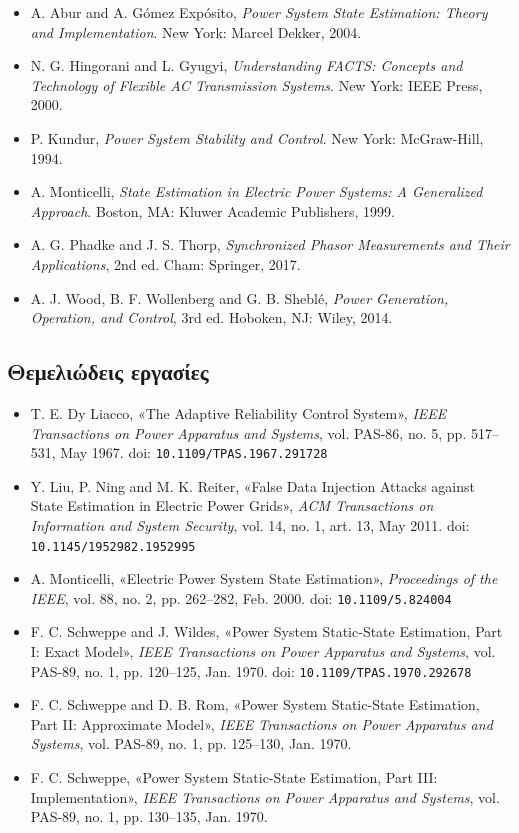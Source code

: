 \begin{itemize}
\item A. Abur and A. Gómez Expósito, \textit{Power System State Estimation: Theory and
      Implementation}. New York: Marcel Dekker, 2004.
\item N. G. Hingorani and L. Gyugyi, \textit{Understanding FACTS: Concepts and Technology of
      Flexible AC Transmission Systems}. New York: IEEE Press, 2000.
\item P. Kundur, \textit{Power System Stability and Control}. New York: McGraw-Hill, 1994.
\item A. Monticelli, \textit{State Estimation in Electric Power Systems: A Generalized
      Approach}. Boston, MA: Kluwer Academic Publishers, 1999.
\item A. G. Phadke and J. S. Thorp, \textit{Synchronized Phasor Measurements and Their
      Applications}, 2nd ed. Cham: Springer, 2017.
\item A. J. Wood, B. F. Wollenberg and G. B. Sheblé, \textit{Power Generation, Operation, and
      Control}, 3rd ed. Hoboken, NJ: Wiley, 2014.
\end{itemize}

\subsection*{Θεμελιώδεις εργασίες}

\begin{itemize}
\item T. E. Dy Liacco, «The Adaptive Reliability Control System», \textit{IEEE Transactions
      on Power Apparatus and Systems}, vol. PAS-86, no. 5, pp. 517--531, May 1967.
      doi: \texttt{10.1109/TPAS.1967.291728}
\item Y. Liu, P. Ning and M. K. Reiter, «False Data Injection Attacks against State
      Estimation in Electric Power Grids», \textit{ACM Transactions on Information and System
      Security}, vol. 14, no. 1, art. 13, May 2011.
      doi: \texttt{10.1145/1952982.1952995}
\item A. Monticelli, «Electric Power System State Estimation», \textit{Proceedings of the
      IEEE}, vol. 88, no. 2, pp. 262--282, Feb. 2000.
      doi: \texttt{10.1109/5.824004}
\item F. C. Schweppe and J. Wildes, «Power System Static-State Estimation, Part I: Exact
      Model», \textit{IEEE Transactions on Power Apparatus and Systems}, vol. PAS-89, no. 1,
      pp. 120--125, Jan. 1970. doi: \texttt{10.1109/TPAS.1970.292678}
\item F. C. Schweppe and D. B. Rom, «Power System Static-State Estimation, Part II:
      Approximate Model», \textit{IEEE Transactions on Power Apparatus and Systems},
      vol. PAS-89, no. 1, pp. 125--130, Jan. 1970.
\item F. C. Schweppe, «Power System Static-State Estimation, Part III: Implementation»,
      \textit{IEEE Transactions on Power Apparatus and Systems}, vol. PAS-89, no. 1,
      pp. 130--135, Jan. 1970.
\end{itemize}

